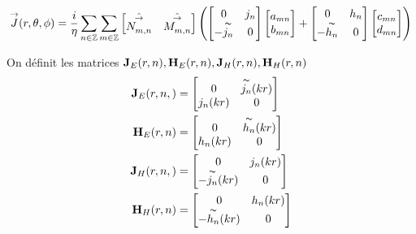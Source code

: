        \begin{equation}
            {\overset{\rightarrow}{J}}(r,\theta,\phi) = \dfrac{i}{\eta}\sum_{n\in\mathbb Z}\sum_{m\in\mathbb Z}
            \begin{bmatrix}
                \hat{{\overset{\rightarrow}{N_{m,n}^{{}}}}} & \hat{{\overset{\rightarrow}{M_{m,n}^{{}}}}}
            \end{bmatrix}
            \left( 
                \begin{bmatrix}
                    0 & j_n
                    \\
                    -\overset{\thicksim}{j_n} & 0
                \end{bmatrix}
                \begin{bmatrix}
                    a_{mn}
                    \\
                    b_{mn}
                \end{bmatrix}
                + 
                \begin{bmatrix}
                    0 & h_n
                    \\
                    -\overset{\thicksim}{h_n} & 0
                \end{bmatrix}
                \begin{bmatrix}
                    c_{mn}
                    \\
                    d_{mn}
                \end{bmatrix}
            \right)
        \end{equation}

        \begin{defn}
            On définit les matrices \(\mathbf{J}_{E}(r,n),\mathbf{H}_{E}(r,n),\mathbf{J}_{H}(r,n),\mathbf{H}_{H}(r,n)\)
            \begin{align}
                \mathbf{J}_{E}(r,n,) &=
                \begin{bmatrix}
                    0 & \overset{\thicksim}{j_n}(kr)
                    \\
                    j_n(kr) & 0
                \end{bmatrix}
                \\
                \mathbf{H}_{E}(r,n) &=
                \begin{bmatrix}
                    0 & \overset{\thicksim}{h_n}(kr)
                    \\
                    h_n(kr) & 0
                \end{bmatrix}
                \\
                \mathbf{J}_{H}(r,n,) &=
                \begin{bmatrix}
                    0 & j_n(kr)
                    \\
                    -\overset{\thicksim}{j_n}(kr) & 0
                \end{bmatrix}
                \\
                \mathbf{H}_{H}(r,n) &=
                \begin{bmatrix}
                    0 & h_n(kr)
                    \\
                    -\overset{\thicksim}{h_n}(kr) & 0
                \end{bmatrix}
            \end{align}
        \end{defn}

